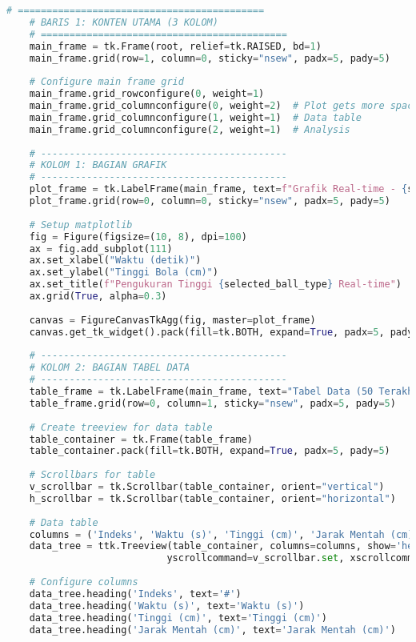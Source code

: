 \begin{itemize}
\begin{scriptsize}
\begin{lstlisting}[language=python]
    # ===========================================
    # BARIS 1: KONTEN UTAMA (3 KOLOM)
    # ===========================================
    main_frame = tk.Frame(root, relief=tk.RAISED, bd=1)
    main_frame.grid(row=1, column=0, sticky="nsew", padx=5, pady=5)
    
    # Configure main frame grid
    main_frame.grid_rowconfigure(0, weight=1)
    main_frame.grid_columnconfigure(0, weight=2)  # Plot gets more space
    main_frame.grid_columnconfigure(1, weight=1)  # Data table
    main_frame.grid_columnconfigure(2, weight=1)  # Analysis
    
    # -------------------------------------------
    # KOLOM 1: BAGIAN GRAFIK
    # -------------------------------------------
    plot_frame = tk.LabelFrame(main_frame, text=f"Grafik Real-time - {selected_ball_type}", font=("Arial", 12, "bold"))
    plot_frame.grid(row=0, column=0, sticky="nsew", padx=5, pady=5)
    
    # Setup matplotlib
    fig = Figure(figsize=(10, 8), dpi=100)
    ax = fig.add_subplot(111)
    ax.set_xlabel("Waktu (detik)")
    ax.set_ylabel("Tinggi Bola (cm)")
    ax.set_title(f"Pengukuran Tinggi {selected_ball_type} Real-time")
    ax.grid(True, alpha=0.3)
    
    canvas = FigureCanvasTkAgg(fig, master=plot_frame)
    canvas.get_tk_widget().pack(fill=tk.BOTH, expand=True, padx=5, pady=5)
    
    # -------------------------------------------
    # KOLOM 2: BAGIAN TABEL DATA
    # -------------------------------------------
    table_frame = tk.LabelFrame(main_frame, text="Tabel Data (50 Terakhir)", font=("Arial", 12, "bold"))
    table_frame.grid(row=0, column=1, sticky="nsew", padx=5, pady=5)
    
    # Create treeview for data table
    table_container = tk.Frame(table_frame)
    table_container.pack(fill=tk.BOTH, expand=True, padx=5, pady=5)
    
    # Scrollbars for table
    v_scrollbar = tk.Scrollbar(table_container, orient="vertical")
    h_scrollbar = tk.Scrollbar(table_container, orient="horizontal")
    
    # Data table
    columns = ('Indeks', 'Waktu (s)', 'Tinggi (cm)', 'Jarak Mentah (cm)')
    data_tree = ttk.Treeview(table_container, columns=columns, show='headings',
                            yscrollcommand=v_scrollbar.set, xscrollcommand=h_scrollbar.set)
    
    # Configure columns
    data_tree.heading('Indeks', text='#')
    data_tree.heading('Waktu (s)', text='Waktu (s)')
    data_tree.heading('Tinggi (cm)', text='Tinggi (cm)')
    data_tree.heading('Jarak Mentah (cm)', text='Jarak Mentah (cm)')
    

\end{lstlisting}
\end{scriptsize}
\end{itemize}
